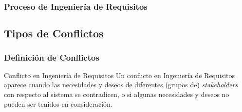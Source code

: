 \documentclass[handout,a4paper,slidestop,xcolor=pst,dvips,blue]{beamer}
\begin{document}
\begin{frame}
    \frametitle{Proceso de Ingeniería de Requisitos}
\end{frame}

\subsection{Tipos de Conflictos}

\begin{frame}[c]
    \frametitle{Definición de Conflictos}
    \begin{block}{Conflicto en Ingeniería de Requisitos}
        Un conflicto en Ingeniería de Requisitos aparece cuando las necesidades y deseos de diferentes (grupos de) \emph{stakeholders} con respecto al sistema se contradicen, o si algunas necesidades y deseos no pueden ser tenidos en consideración.
    \end{block}
\end{frame}
\end{document}
